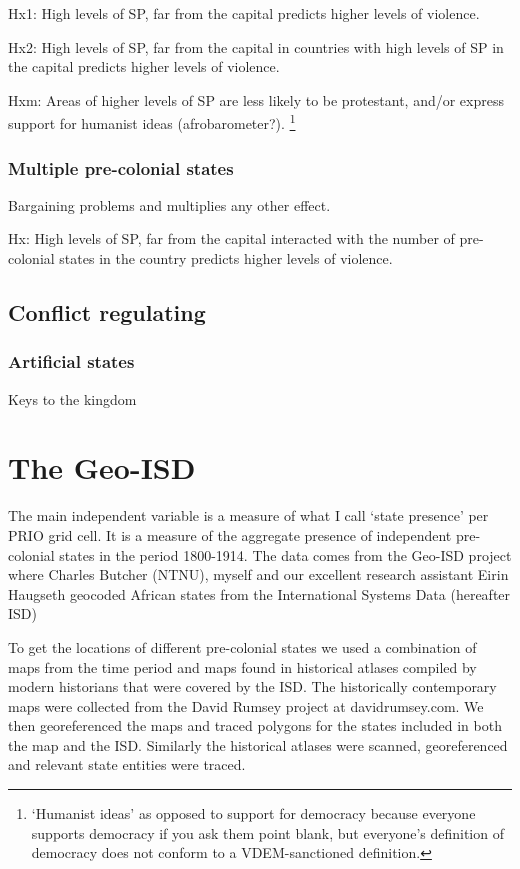 \documentclass[12pt]{article}
\begin{document}
Hx1: High levels of SP, far from the capital predicts higher levels of violence. 

Hx2: High levels of SP, far from the capital in countries with high levels of SP
in the capital predicts higher levels of violence. 

Hxm: Areas of higher levels of SP are less likely to be protestant, and/or
express support for humanist ideas (afrobarometer?). \footnote{`Humanist ideas'
as opposed to support for democracy because everyone supports democracy if you
ask them point blank, but everyone's definition of democracy does not conform to
a VDEM-sanctioned definition.}

\subsubsection{Multiple pre-colonial states}

Bargaining problems and multiplies any other effect.

Hx: High levels of SP, far from the capital interacted with the number of
pre-colonial states in the country predicts higher levels of violence.

\subsection{Conflict regulating}

\subsubsection{Artificial states}

Keys to the kingdom

\section{The Geo-ISD}

The main independent variable is a measure of what I call `state presence' per
PRIO grid cell. It is a measure of the aggregate presence of independent
pre-colonial states in the period 1800-1914. The data comes from the Geo-ISD
project where Charles Butcher (NTNU), myself and our excellent research
assistant Eirin Haugseth geocoded African states from the International Systems
Data (hereafter ISD) \citep{Griffiths2013}

To get the locations of different pre-colonial states we used a combination of
maps from the time period and maps found in historical atlases compiled by
modern historians that were covered by the ISD. The historically contemporary
maps were collected from the David Rumsey project at davidrumsey.com. We then
georeferenced the maps and traced polygons for the states included in both the
map and the ISD. Similarly the historical atlases were scanned, georeferenced
and relevant state entities were traced.
\end{document}
